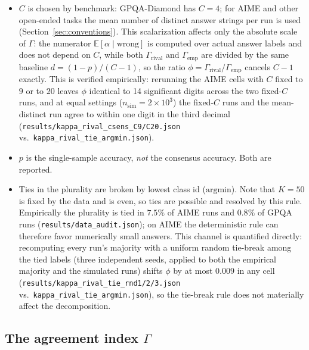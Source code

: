 \documentclass[a4paper,fleqn]{cas-sc}
\newcommand{\agreementIndex}{\Gamma}
\begin{document}
\begin{itemize}
\item $C$ is chosen by benchmark: GPQA-Diamond has $C=4$; for AIME and
  other open-ended tasks the mean number of distinct answer strings per run is used
  (Section~\ref{sec:conventions}).
  \label{item:C}
  This scalarization affects only the absolute scale of $\agreementIndex$: the
  numerator $\mathbb{E}[\alpha\mid\text{wrong}]$ is computed over
  actual answer labels and does not depend on $C$, while both
  $\agreementIndex_{\mathrm{rival}}$ and $\agreementIndex_{\mathrm{emp}}$ are divided by the
  same baseline $d=(1-p)/(C-1)$, so the ratio
  $\phi=\agreementIndex_{\mathrm{rival}}/\agreementIndex_{\mathrm{emp}}$ cancels $C-1$
  exactly. This is verified empirically: rerunning the AIME cells with $C$
  fixed to $9$ or to $20$ leaves $\phi$ identical to 14 significant digits across the two
  fixed-$C$ runs, and at equal settings ($n_{\mathrm{sim}}=2\times10^3$)
  the fixed-$C$ runs and the mean-distinct run agree to within one digit
  in the third decimal
  (\texttt{results/kappa\_rival\_csens\_C9/C20.json} vs.\ 
  \texttt{kappa\_rival\_tie\_argmin.json}).
\item $p$ is the single-sample accuracy, \emph{not} the consensus
  accuracy. Both are reported.
\item Ties in the plurality are broken by lowest class id
  ($\mathrm{argmin}$). Note that $K=50$ is fixed by the data and is
  even, so ties are possible and resolved by this rule. Empirically the
  plurality is tied in $7.5\%$ of AIME runs and $0.8\%$ of GPQA runs (\texttt{results/data\_audit.json});
  on AIME the deterministic rule can therefore favor numerically small
  answers. This channel is quantified directly: recomputing every run's
  majority with a uniform random tie-break among the tied labels (three
  independent seeds, applied to both the empirical majority and the
  simulated runs) shifts $\phi$ by at most $0.009$ in any cell
  (\texttt{results/kappa\_rival\_tie\_rnd1/2/3.json} vs.\
  \texttt{kappa\_rival\_tie\_argmin.json}), so the tie-break rule does
  not materially affect the decomposition.
\end{itemize}

\subsection{The agreement index $\agreementIndex$}
\label{sec:kappa}
\end{document}
